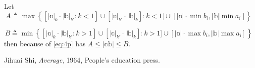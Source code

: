 \documentclass[12pt,a4paper,reqno]{amsart}
\theoremstyle{plain}
\theoremstyle{definition}
\begin{document}
\begin{enumerate}
  Let 
  $$ A \triangleq \max \left\{ [ |\mathbb{a}|_k\cdot |\mathbb{b}|_{k'}: k < 1 ]\cup[|\mathbb{a}|_{k'}\cdot |\mathbb{b}|_k]: k<1]\cup[|\mathbb{a}|\cdot \min b_i, |\mathbb{b}|\min a_i]\right\}$$ 

  $$ B \triangleq \min \left\{ [ |\mathbb{a}|_k\cdot |\mathbb{b}|_{k'}: k > 1 ]\cup[|\mathbb{a}|_{k'}\cdot |\mathbb{b}|_k]: k>1]\cup[|\mathbb{a}|\cdot \max b_i, |\mathbb{b}|\max a_i]\right\}$$ 
  then because of \eqref{eq:4p} has $A\leqslant |\mathbb{a b}| \leqslant B$. 

\end{enumerate}




\begin{thebibliography}{99} 

 Jihuai Shi, \textit{Average}, 1964, People's education press.  


\end{thebibliography}
\end{document}

